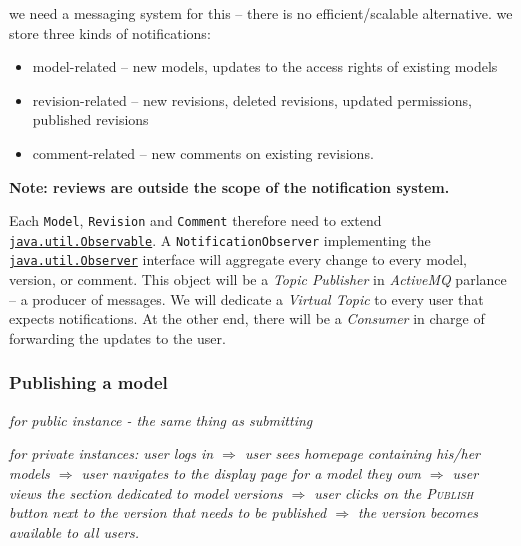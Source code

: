 \begin{techNote}
we need a messaging system for this -- there is no efficient/scalable alternative. we store three kinds of notifications: 
\begin{itemize}
\item model-related -- new models, updates to the access rights of existing models
\item revision-related -- new revisions, deleted revisions, updated permissions, published revisions
\item comment-related -- new comments on existing revisions.
\end{itemize}
\textbf{Note: reviews are outside the scope of the notification system.}

Each \texttt{Model}, \texttt{Revision} and \texttt{Comment} therefore need to extend \href{http://docs.oracle.com/javase/6/docs/api/java/util/Observable.html}{\texttt{java.util.Observable}}. A \texttt{NotificationObserver} implementing the \href{http://docs.oracle.com/javase/6/docs/api/java/util/Observer.html}{\texttt{java.util.Observer}} interface will aggregate every change to every model, version, or comment. This object will be a \emph{Topic Publisher} in \emph{ActiveMQ} parlance -- a producer of messages. We will dedicate a \emph{Virtual Topic} to every user that expects notifications. At the other end, there will be a \emph{Consumer} in charge of forwarding the updates to the user. 
\end{techNote}


\subsubsection{Publishing a model}
\emph{for public instance - the same thing as submitting}

\emph{for private instances: user logs in $\Rightarrow$ user sees homepage containing his/her models $\Rightarrow$ user navigates to the display page for a model they own $\Rightarrow$ user views the section dedicated to model versions $\Rightarrow$ user clicks on the \textsc{Publish} button next to the version that needs to be published $\Rightarrow$ the version becomes available to all users. 
}

